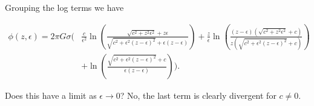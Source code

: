 Grouping the log terms we have

\begin{equation}\label{eqn:InfinitePlanePotentialTakeIII:90b}
\begin{aligned}
\phi (z, \epsilon )
=
2 \pi  G \sigma  \Biggl( 
&\frac{c}{\epsilon ^2}\ln \left(\frac{\sqrt{c^2+z^2 \epsilon ^2}+z \epsilon }{\sqrt{c^2+\epsilon ^2(z-\epsilon )^2}+\epsilon (z-\epsilon )}\right) 
+ \frac{z}{\epsilon } \ln \left(\frac{(z-\epsilon ) \left(\sqrt{c^2+z^2 \epsilon ^2}+c\right)}{z\left(\sqrt{c^2+\epsilon ^2 (z-\epsilon )^2}+c\right)}\right) \\
&+ \ln \left(\frac{\sqrt{c^2+\epsilon ^2 (z-\epsilon )^2}+c}{\epsilon  (z-\epsilon )}\right) 
\Biggr).
\end{aligned}
\end{equation}

Does this have a limit as $\epsilon \rightarrow 0$?  No, the last term is clearly divergent for $c \neq 0$.

\EndNoBibArticle
